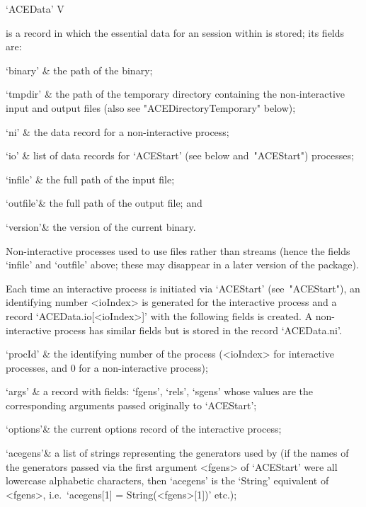 
\>`ACEData' V

is a {\GAP} record in which the essential data for an  {\ACE}  session
within {\GAP} is stored; its fields are:

\beginitems

\quad`binary' & the path of the {\ACE} binary;

\quad`tmpdir' & the path of the  temporary  directory  containing  the
non-interactive   {\ACE}   input   and   output   files   (also    see
"ACEDirectoryTemporary" below);

\quad`ni'     & the data record for a non-interactive {\ACE} process;

\quad`io'     & list  of  data  records  for  `ACEStart'   (see  below 
and~"ACEStart") processes;

\quad`infile' & the full path of the {\ACE} input file;

\quad`outfile'& the full path of the {\ACE} output file; and

\quad`version'& the  version  of  the  current  {\ACE}  binary.

\enditems

Non-interactive processes used to use files rather than streams (hence
the fields `infile' and `outfile' above;  these  may  disappear  in  a
later version of the {\ACE} package).

Each time an interactive {\ACE} process is  initiated  via  `ACEStart'
(see~"ACEStart"), an identifying number <ioIndex> is generated for the
interactive process and  a  record  `ACEData.io[<ioIndex>]'  with  the
following fields is created. A  non-interactive  process  has  similar
fields but is stored in the record `ACEData.ni'.

\beginitems

\quad`procId' & the identifying number of the process  (<ioIndex>  for
interactive processes, and 0 for a non-interactive process);

\quad`args'   & a record with fields: `fgens', `rels',  `sgens'  whose
values  are  the  corresponding   arguments   passed   originally   to
`ACEStart';

\quad`options'& the current options record of the interactive process;

\quad`acegens'& a list of strings representing the generators used  by
{\ACE} (if the names of the generators passed via the  first  argument
<fgens> of `ACEStart' were all lowercase alphabetic  characters,  then
`acegens' is the `String' equivalent of <fgens>,  i.e.~`acegens[1]   =
String(<fgens>[1])' etc.);

